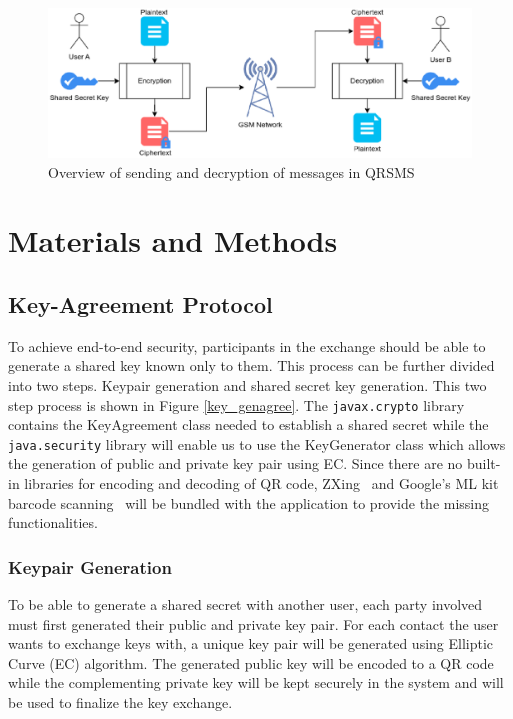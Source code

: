 \documentclass[journal]{./IEEE/IEEEtran}
\begin{document}
\begin{figure}
	\centering
	\includegraphics[width=6in]{images/encrypted_messaging.eps}
	\caption{Overview of sending and decryption of messages in
		QRSMS}
	\label{encrypted}
\end{figure}

\section{Materials and Methods}
\subsection{Key-Agreement Protocol}
To achieve end-to-end security, participants in the exchange should be able to
generate a shared key known only to them. This process can be further divided
into two steps. Keypair generation and shared secret key generation. This two
step process is shown in Figure \ref{key_genagree}.
The \lstinline{javax.crypto} library contains the KeyAgreement class needed to
establish a shared secret while the \lstinline{java.security} library
will enable us to use the KeyGenerator class which allows the generation of
public and private key pair using EC. Since there are no built-in libraries
for encoding and decoding of QR code, ZXing~\cite{zxing} and Google's ML
kit barcode scanning~\cite{mlkit} will be bundled with the application to
provide the missing functionalities.

\subsubsection{Keypair Generation}
To be able to generate a shared secret with another user, each party involved
must first generated their public and private key pair. For each contact the
user wants to exchange keys with, a unique key pair will be generated
using Elliptic Curve (EC) algorithm.
The generated public key will be encoded to a QR code while the complementing
private key will be kept securely in the system and will be used to finalize
the key exchange.
\end{document}
